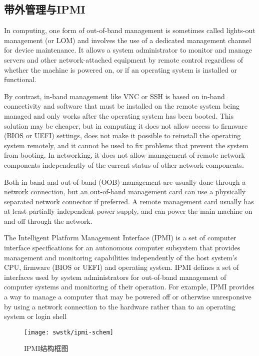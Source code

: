 \subsection{带外管理与IPMI}

In computing, one form of out-of-band management is sometimes called lights-out management (or LOM) and involves the use of a dedicated management channel for device maintenance. It allows a system administrator to monitor and manage servers and other network-attached equipment by remote control regardless of whether the machine is powered on, or if an operating system is installed or functional.

By contrast, in-band management like VNC or SSH is based on in-band connectivity and software that must be installed on the remote system being managed and only works after the operating system has been booted. This solution may be cheaper, but in computing it does not allow access to firmware (BIOS or UEFI) settings, does not make it possible to reinstall the operating system remotely, and it cannot be used to fix problems that prevent the system from booting. In networking, it does not allow management of remote network components independently of the current status of other network components.

Both in-band and out-of-band (OOB) management are usually done through a network connection, but an out-of-band management card can use a physically separated network connector if preferred. A remote management card usually has at least partially independent power supply, and can power the main machine on and off through the network.

The Intelligent Platform Management Interface (IPMI) is a set of computer interface specifications for an autonomous computer subsystem that provides management and monitoring capabilities independently of the host system's CPU, firmware (BIOS or UEFI) and operating system. IPMI defines a set of interfaces used by system administrators for out-of-band management of computer systems and monitoring of their operation. For example, IPMI provides a way to manage a computer that may be powered off or otherwise unresponsive by using a network connection to the hardware rather than to an operating system or login shell

\begin{figure}[tbh]
  \centering
  \texttt{[image: swstk/ipmi-schem]}
  \caption{IPMI结构框图}
  \label{fig:ipmi-schem}
\end{figure}

